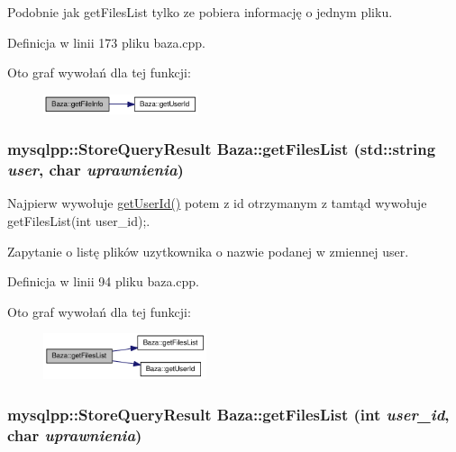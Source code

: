 Podobnie jak getFilesList tylko ze pobiera informację o jednym pliku. 



Definicja w linii 173 pliku baza.cpp.

Oto graf wywołań dla tej funkcji:\nopagebreak
\begin{figure}[H]
\begin{center}
\leavevmode
\includegraphics[width=129pt]{d8/d84/a00001_bc2479ccfcd28a0d2f7f303d202abfde_cgraph}
\end{center}
\end{figure}
\hypertarget{a00001_a90465dbd3a416904aee22161a96cde2}{
\subsubsection[{getFilesList}]{\setlength{\rightskip}{0pt plus 5cm}mysqlpp::StoreQueryResult Baza::getFilesList (std::string {\em user}, \/  char {\em uprawnienia})}}
\label{d8/d84/a00001_a90465dbd3a416904aee22161a96cde2}


Najpierw wywołuje \hyperlink{a00001_65054f08c8fd7c600f6c2fe2c7f61a43}{getUserId()} potem z id otrzymanym z tamtąd wywołuje getFilesList(int user\_\-id);. 

Zapytanie o listę plików uzytkownika o nazwie podanej w zmiennej user. 

Definicja w linii 94 pliku baza.cpp.

Oto graf wywołań dla tej funkcji:\nopagebreak
\begin{figure}[H]
\begin{center}
\leavevmode
\includegraphics[width=136pt]{d8/d84/a00001_a90465dbd3a416904aee22161a96cde2_cgraph}
\end{center}
\end{figure}
\hypertarget{a00001_a391c1fd3cb3f0b178ceeed9e4d8652e}{
\subsubsection[{getFilesList}]{\setlength{\rightskip}{0pt plus 5cm}mysqlpp::StoreQueryResult Baza::getFilesList (int {\em user\_\-id}, \/  char {\em uprawnienia})}}
\label{d8/d84/a00001_a391c1fd3cb3f0b178ceeed9e4d8652e}


